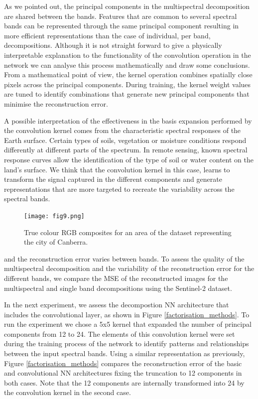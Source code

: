 \documentclass[essd, manuscript]{copernicus}
\begin{document}
As we pointed out, the principal components in the multispectral decomposition are shared between the bands. Features that are common to several spectral bands can be represented through the same principal component resulting in more efficient representations than the case of individual, per band, decompositions. Although it is not straight forward to give a physically interpretable explanation to the functionality of the convolution operation in the network we can analyse this process mathematically and draw some conclusions. From a mathematical point of view, the kernel operation combines spatially close pixels across the principal components. During training, the kernel weight values are tuned to identify combinations that generate new principal components that minimise the reconstruction error. 

A possible interpretation of the effectiveness in the basis expansion performed by the convolution kernel comes from the characteristic spectral responses of the Earth surface. Certain types of soils, vegetation or moisture conditions respond differently at different parts of the spectrum. In remote sensing, known spectral response curves allow the identification of the type of soil or water content on the land's surface. We think that the convolution kernel in this case, learns to transform the signal captured in the different components and generate representations that are more targeted to recreate the variability across the spectral bands. 

\begin{figure}
    \texttt{[image: fig9.png]}
    \caption{True colour RGB composites for an area of the dataset representing the city of Canberra.}%
    \label{compression_cmp}%
\end{figure}

and the reconstruction error varies between bands. To assess the quality of the multispectral decomposition and the variability of the reconstruction error for the different bands, we compare the MSE of the reconstructed images for the multispectral and single band decompositions using the Sentinel-2 dataset. 

In the next experiment, we assess the decompostion NN architecture that includes the convolutional layer, as shown in Figure \ref{factorisation_methods}. To run the experiment we chose a 5x5 kernel that expanded the number of principal components from 12 to 24. The elements of this convolution kernel were set during the training process of the network to identify patterns and relationships between the input spectral bands. Using a similar representation as previously, Figure \ref{factorisation_methods} compares the reconstruction error of the basic and convolutional NN architectures fixing the truncation to 12 components in both cases. Note that the 12 components are internally transformed into 24 by the convolution kernel in the second case.
\end{document}
